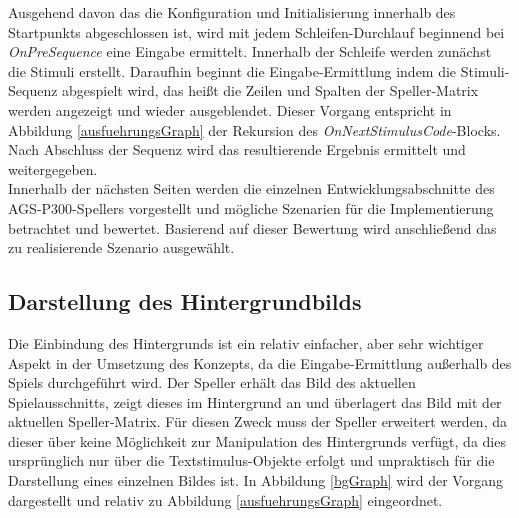 Ausgehend davon das die Konfiguration und Initialisierung innerhalb des Startpunkts abgeschlossen ist, wird mit jedem Schleifen-Durchlauf beginnend bei \textit{OnPreSequence} eine Eingabe ermittelt.
Innerhalb der Schleife werden zunächst die Stimuli erstellt. 
Daraufhin beginnt die Eingabe-Ermittlung indem die Stimuli-Sequenz abgespielt wird, das heißt die Zeilen und Spalten der Speller-Matrix werden angezeigt und wieder ausgeblendet.
Dieser Vorgang entspricht in Abbildung \ref{ausfuehrungsGraph} der Rekursion des \textit{OnNextStimulusCode}-Blocks.
Nach Abschluss der Sequenz wird das resultierende Ergebnis ermittelt und weitergegeben.\\

Innerhalb der nächsten Seiten werden die einzelnen Entwicklungsabschnitte des AGS-P300-Spellers vorgestellt 
und mögliche Szenarien für die Implementierung betrachtet und bewertet. 
Basierend auf dieser Bewertung wird anschließend das zu realisierende Szenario ausgewählt.\\






\pagebreak
\subsection{Darstellung des Hintergrundbilds}
\vspace{0.3cm}

Die Einbindung des Hintergrunds ist ein relativ einfacher, aber sehr wichtiger Aspekt in der Umsetzung des Konzepts, da die Eingabe-Ermittlung außerhalb des Spiels durchgeführt wird.
Der Speller erhält das Bild des aktuellen Spielausschnitts, zeigt dieses im Hintergrund an und überlagert das Bild mit der aktuellen Speller-Matrix. 
Für diesen Zweck muss der Speller erweitert werden, da dieser über keine Möglichkeit zur Manipulation des Hintergrunds verfügt, 
da dies ursprünglich nur über die Textstimulus-Objekte erfolgt und unpraktisch für die Darstellung eines einzelnen Bildes ist.
In Abbildung \ref{bgGraph} wird der Vorgang dargestellt und relativ zu Abbildung \ref{ausfuehrungsGraph} eingeordnet.\\


